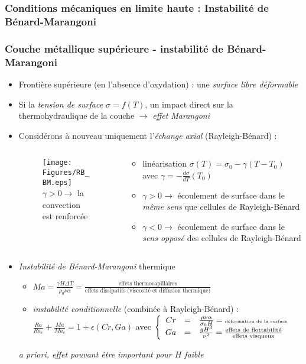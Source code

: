 \subsubsection{Conditions mécaniques en limite haute : Instabilité de Bénard-Marangoni}
\begin{frame}[fragile]
\frametitle{Couche métallique supérieure - instabilité de Bénard-Marangoni}
\begin{itemize}
  \item Frontière supérieure (en l'absence d'oxydation) : une \emph{surface libre déformable}
  \item Si la \emph{tension de surface $\sigma=f(T)$}, un impact direct sur la thermohydraulique de la couche $\rightarrow$ \emph{effet Marangoni}
  \item Considérons à nouveau uniquement l'\emph{échange axial} (Rayleigh-Bénard) :
\begin{columns}[T]
    \begin{column}{0.35\textwidth}
    \baselineskip
\begin{figure}[H]
\centering \texttt{[image: Figures/RB\_BM.eps]} \\
    \baselineskip
{\tiny $\gamma > 0 \rightarrow$ la convection est renforcée}
\end{figure}
    \end{column}
    \begin{column}{0.65\textwidth}
\begin{itemize}
\item linéarisation {\scriptsize $\sigma(T) =\sigma_0 - \gamma \left(T-T_0\right)$} avec \emph{$\gamma=-\frac{d\sigma}{dT}(T_0)$}
\item \emph{$\gamma > 0 \rightarrow$} écoulement de surface dans le \emph{même sens} que cellules de Rayleigh-Bénard
\item \emph{$\gamma < 0 \rightarrow$} écoulement de surface dans le \emph{sens opposé} des cellules de Rayleigh-Bénard
\end{itemize}
    \end{column}
    \end{columns}
\item \emph{Instabilité de Bénard-Marangoni} thermique
\begin{itemize}
\item $Ma=\frac{\gamma H \Delta T}{\rho_0 \nu \alpha}=\frac{\text{effets thermocapillaires}}{\text{effets dissipatifs (viscosité et diffusion thermique)}}$
\item \emph{instabilité conditionnelle} (combinée à Rayleigh-Bénard) : \cite{Nield1964} \\
$\displaystyle \frac{Ra}{Ra_c} + \frac{Ma}{Ma_c} = 1 + \epsilon(Cr,Ga)$ 
avec $\left\{\begin{array}{rcl} 
      Cr&=&\frac{\rho\nu\alpha}{\sigma_0 H} ={\tiny\text{déformation de la surface}} \\ 
      Ga&=&\frac{gH^3}{\nu^2}=\frac{\text{effets de flottabilité}}{\text{effets visqueux}}\end{array}\right.$
\end{itemize}
\emph{\textit{a priori}, effet pouvant être important pour $H$ faible}
\end{itemize}
\end{frame}
